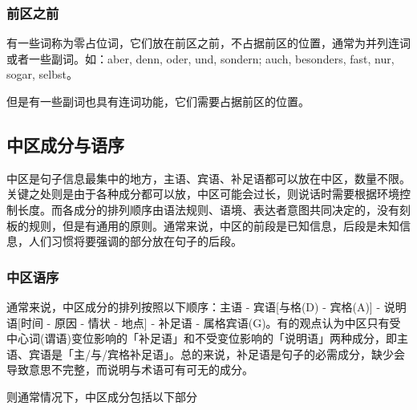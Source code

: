 \subsubsection{前区之前}
有一些词称为零占位词，它们放在前区之前，不占据前区的位置，通常为并列连词或者一些副词。如：aber, denn, oder, und, sondern; auch, besonders, fast, nur, sogar, selbst。


但是有一些副词也具有连词功能，它们需要占据前区的位置。


\subsection{中区成分与语序}
中区是句子信息最集中的地方，主语、宾语、补足语都可以放在中区，数量不限。关键之处则是由于各种成分都可以放，中区可能会过长，则说话时需要根据环境控制长度。而各成分的排列顺序由语法规则、语境、表达者意图共同决定的，没有刻板的规则，但是有通用的原则。通常来说，中区的前段是已知信息，后段是未知信息，人们习惯将要强调的部分放在句子的后段。

\subsubsection{中区语序}
通常来说，中区成分的排列按照以下顺序：主语 - 宾语[与格(D) - 宾格(A)] - 说明语[时间 - 原因 - 情状 - 地点] - 补足语 - 属格宾语(G)。有的观点认为中区只有受中心词(谓语)变位影响的「补足语」和不受变位影响的「说明语」两种成分，即主语、宾语是「主/与/宾格补足语」。总的来说，补足语是句子的必需成分，缺少会导致意思不完整，而说明与术语可有可无的成分。

则通常情况下，中区成分包括以下部分

